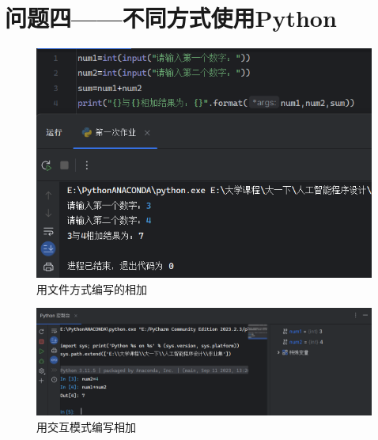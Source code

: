\documentclass[10pt]{article}
\begin{document}
\section{问题四——不同方式使用Python}
	\begin{figure}[H]
		\centering
		\includegraphics[scale=0.6]{用文件方式编写的相加}
		\caption{用文件方式编写的相加}
	\end{figure}
	\begin{figure}[H]
		\centering
		\includegraphics[scale=0.55]{用交互模式编写相加}
		\caption{用交互模式编写相加}
	\end{figure}


	
\end{document}
